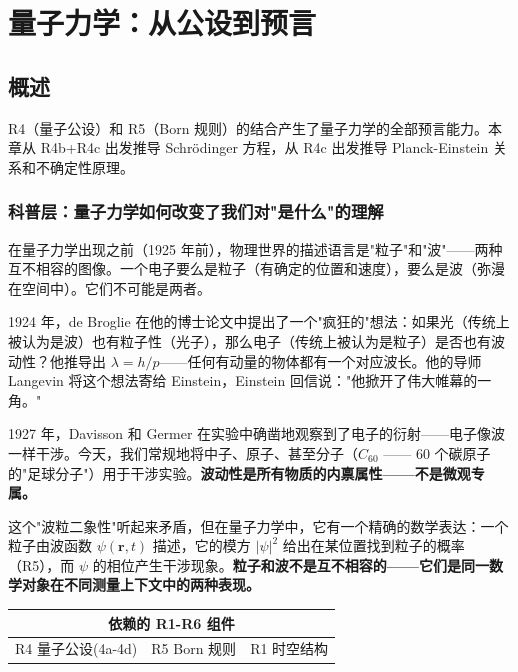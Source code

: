 \chapter{量子力学：从公设到预言}
\label{ch:quantum}

\section{概述}

R4（量子公设）和 R5（Born 规则）的结合产生了量子力学的全部预言能力。本章从 R4b+R4c 出发推导 Schr\"{o}dinger 方程，从 R4c 出发推导 Planck-Einstein 关系和不确定性原理。

\subsection{科普层：量子力学如何改变了我们对"是什么"的理解}

在量子力学出现之前（1925 年前），物理世界的描述语言是"粒子"和"波"——两种互不相容的图像。一个电子要么是粒子（有确定的位置和速度），要么是波（弥漫在空间中）。它们不可能是两者。

1924 年，de Broglie 在他的博士论文中提出了一个"疯狂的"想法：如果光（传统上被认为是波）也有粒子性（光子），那么电子（传统上被认为是粒子）是否也有波动性？他推导出 $\lambda = h/p$——任何有动量的物体都有一个对应波长。他的导师 Langevin 将这个想法寄给 Einstein，Einstein 回信说："他掀开了伟大帷幕的一角。"

1927 年，Davisson 和 Germer 在实验中确凿地观察到了电子的衍射——电子像波一样干涉。今天，我们常规地将中子、原子、甚至分子（$C_{60}$ —— 60 个碳原子的"足球分子"）用于干涉实验。\textbf{波动性是所有物质的内禀属性——不是微观专属。}

这个"波粒二象性"听起来矛盾，但在量子力学中，它有一个精确的数学表达：一个粒子由波函数 $\psi(\mathbf{r},t)$ 描述，它的模方 $|\psi|^2$ 给出在某位置找到粒子的概率（R5），而 $\psi$ 的相位产生干涉现象。\textbf{粒子和波不是互不相容的——它们是同一数学对象在不同测量上下文中的两种表现。}

\begin{center}
\small
\begin{tabular}{p{3.5cm}p{3.5cm}p{3cm}}
\toprule
\multicolumn{3}{c}{\textbf{依赖的 R1-R6 组件}} \\
\midrule
R4 量子公设(4a-4d) & R5 Born 规则 & R1 时空结构 \\
\bottomrule
\end{tabular}
\end{center}

